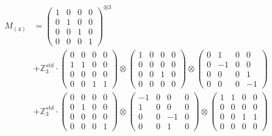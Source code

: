 \documentclass{article}
\newcommand{\Mthree}{%
    M_{(4)}
}
\begin{document}
        \newpage
        
        \footnotesize{
        \begin{align}
        \Mthree
        &= \label{Rs1-Rc16-Strassen-1-c1} \begin{pmatrix} 1 & 0 & 0 & 0 \\ 0 & 1 & 0 & 0 \\ 0 & 0 & 1 & 0 \\ 0 & 0 & 0 & 1 \end{pmatrix}^{\otimes 3} \\
        &+ \label{Rs1-Rc16-Strassen-1-c2} \mathbb{Z}_3^{std} \cdot 
            \begin{pmatrix} 0 & 0 & 0 & 0 \\ 1 & 1 & 0 & 0 \\ 0 & 0 & 0 & 0 \\ 0 & 0 & 1 & 1 \end{pmatrix} \otimes 
            \begin{pmatrix} 1 & 0 & 0 & 0 \\ 0 & 0 & 0 & 0 \\ 0 & 0 & 1 & 0 \\ 0 & 0 & 0 & 0 \end{pmatrix} \otimes 
            \begin{pmatrix} 0 & 1 & 0 & 0 \\ 0 & -1 & 0 & 0 \\ 0 & 0 & 0 & 1 \\ 0 & 0 & 0 & -1 \end{pmatrix} \\ 
        &+ \label{Rs1-Rc16-Strassen-1-c3} \mathbb{Z}_3^{std} \cdot 
            \begin{pmatrix} 0 & 0 & 0 & 0 \\ 0 & 1 & 0 & 0 \\ 0 & 0 & 0 & 0 \\ 0 & 0 & 0 & 1 \end{pmatrix} \otimes 
            \begin{pmatrix} -1 & 0 & 0 & 0 \\ 1 & 0 & 0 & 0 \\ 0 & 0 & -1 & 0 \\ 0 & 0 & 1 & 0 \end{pmatrix} \otimes 
            \begin{pmatrix} 1 & 1 & 0 & 0 \\ 0 & 0 & 0 & 0 \\ 0 & 0 & 1 & 1 \\ 0 & 0 & 0 & 0 \end{pmatrix} \\ 

\end{align}}
\end{document}
